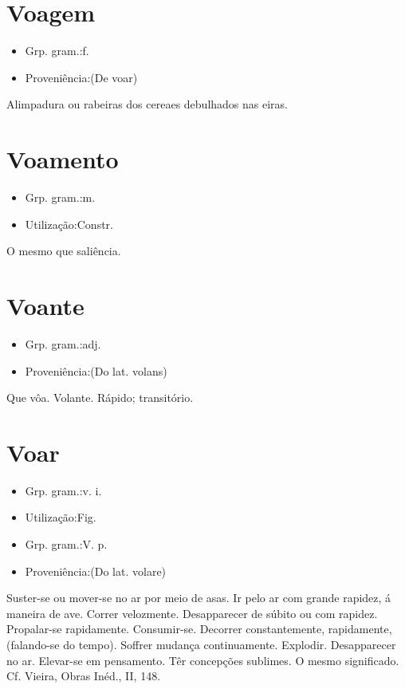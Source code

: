 \documentclass{article}
\begin{document}
\section{Voagem}
\begin{itemize}
\item {Grp. gram.:f.}
\end{itemize}
\begin{itemize}
\item {Proveniência:(De \textunderscore voar\textunderscore )}
\end{itemize}
Alimpadura ou rabeiras dos cereaes debulhados nas eiras.
\section{Voamento}
\begin{itemize}
\item {Grp. gram.:m.}
\end{itemize}
\begin{itemize}
\item {Utilização:Constr.}
\end{itemize}
O mesmo que \textunderscore saliência\textunderscore .
\section{Voante}
\begin{itemize}
\item {Grp. gram.:adj.}
\end{itemize}
\begin{itemize}
\item {Proveniência:(Do lat. \textunderscore volans\textunderscore )}
\end{itemize}
Que vôa.
Volante.
Rápido; transitório.
\section{Voar}
\begin{itemize}
\item {Grp. gram.:v. i.}
\end{itemize}
\begin{itemize}
\item {Utilização:Fig.}
\end{itemize}
\begin{itemize}
\item {Grp. gram.:V. p.}
\end{itemize}
\begin{itemize}
\item {Proveniência:(Do lat. \textunderscore volare\textunderscore )}
\end{itemize}
Suster-se ou mover-se no ar por meio de asas.
Ir pelo ar com grande rapidez, á maneira de ave.
Correr velozmente.
Desapparecer de súbito ou com rapidez.
Propalar-se rapidamente.
Consumir-se.
Decorrer constantemente, rapidamente, (falando-se do tempo).
Soffrer mudança continuamente.
Explodir.
Desapparecer no ar.
Elevar-se em pensamento.
Têr concepções sublimes.
O mesmo significado. Cf. Vieira, \textunderscore Obras Inéd.\textunderscore , II, 148.
\end{document}
